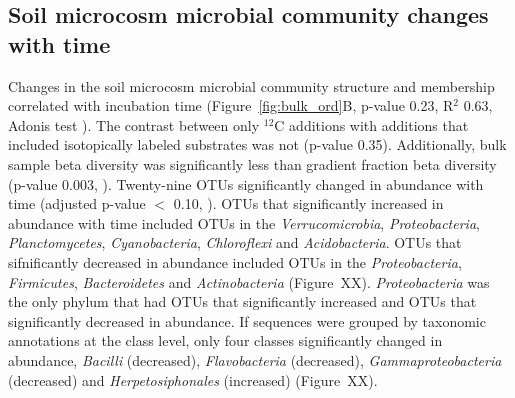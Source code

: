 \subsection{Soil microcosm microbial community changes with time}
Changes in the soil microcosm microbial community structure and membership
correlated with incubation time (Figure~\ref{fig:bulk_ord}B, p-value 0.23,
R$^{2}$ 0.63, Adonis test \citep{Anderson2001a}). The contrast between only
$^{12}$C additions with additions that included isotopically labeled substrates
was not (p-value 0.35). Additionally, bulk sample beta diversity was
significantly less than gradient fraction beta diversity (p-value 0.003,
\citep{Anderson2006}). Twenty-nine OTUs significantly changed in abundance with
time (adjusted p-value $<$ 0.10, \citep{YBenjamini1995}). OTUs that significantly
increased in abundance with time included OTUs in the \textit{Verrucomicrobia},
\textit{Proteobacteria}, \textit{Planctomycetes}, \textit{Cyanobacteria}, 
\textit{Chloroflexi} and \textit{Acidobacteria}. OTUs that sifnificantly decreased in
abundance included OTUs in the \textit{Proteobacteria}, \textit{Firmicutes}, 
\textit{Bacteroidetes} and \textit{Actinobacteria} (Figure~XX). \textit{Proteobacteria}
was the only phylum that had OTUs that significantly increased and OTUs that
significantly decreased in abundance. If sequences were grouped by taxonomic
annotations at the class level, only four classes significantly changed in abundance,
\textit{Bacilli} (decreased), \textit{Flavobacteria} (decreased), 
\textit{Gammaproteobacteria} (decreased) and \textit{Herpetosiphonales} (increased)
(Figure~XX). 
